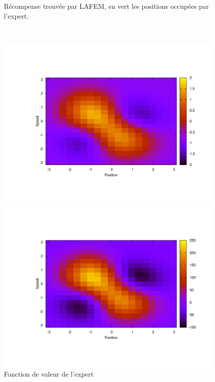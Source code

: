 \documentclass[publibook-draft]{CAp2012}
\begin{document}
{\begin{figure}
\begin{minipage}[t]{.4\linewidth}
\begin{center}
       \caption{Récompense trouvée par LAFEM, en vert les positions occupées par l'expert.}
       \label{lafemR.fig}
    \end{center}
\end{minipage}\\
\begin{minipage}[t]{.4\linewidth}
    \begin{center}
       \includegraphics[width=1.2\textwidth]{LAFEM_Exp3_Vexpert.pdf}
       \caption{Fonction de valeur de l'expert}
       \label{trueV.fig}
    \end{center}
\end{minipage}
\hfill
\begin{minipage}[t]{.4\linewidth}
    \begin{center}
       \includegraphics[width=1.2\textwidth]{LAFEM_Exp3_Vagent.pdf}

\end{center}
\end{minipage}
\end{figure}}
\end{document}

